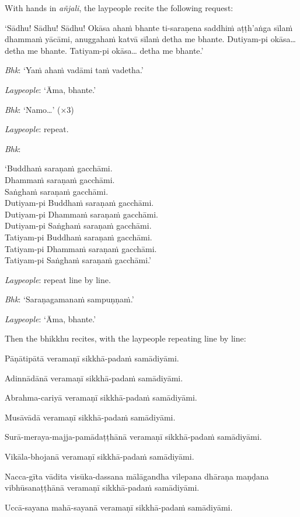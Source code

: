 With hands in \emph{añjali}, the laypeople recite the following request:

‘Sādhu! Sādhu! Sādhu! Okāsa ahaṁ bhante ti-saraṇena saddhiṁ aṭṭh'aṅga sīlaṁ
dhammaṁ yācāmi, anuggahaṁ katvā sīlaṁ detha me bhante. Dutiyam-pi okāsa… detha
me bhante. Tatiyam-pi okāsa… detha me bhante.’

\emph{Bhk}: ‘Yaṁ ahaṁ vadāmi taṁ vadetha.’

\emph{Laypeople}: ‘Āma, bhante.’

\emph{Bhk}: ‘Namo…’ (×3)

\emph{Laypeople}: repeat.

\emph{Bhk}:

‘Buddhaṁ saraṇaṁ gacchāmi.\\
Dhammaṁ saraṇaṁ gacchāmi.\\
Saṅghaṁ saraṇaṁ gacchāmi.\\
Dutiyam-pi Buddhaṁ saraṇaṁ gacchāmi.\\
Dutiyam-pi Dhammaṁ saraṇaṁ gacchāmi.\\
Dutiyam-pi Saṅghaṁ saraṇaṁ gacchāmi.\\
Tatiyam-pi Buddhaṁ saraṇaṁ gacchāmi.\\
Tatiyam-pi Dhammaṁ saraṇaṁ gacchāmi.\\
Tatiyam-pi Saṅghaṁ saraṇaṁ gacchāmi.’

\emph{Laypeople}: repeat line by line.

\emph{Bhk}: ‘Saraṇagamanaṁ sampuṇṇaṁ.’

\emph{Laypeople}: ‘Āma, bhante.’

Then the bhikkhu recites, with the laypeople repeating line by line:

\begin{packeditemize}

\item Pāṇātipātā veramaṇī sikkhā-padaṁ samādiyāmi.
\item Adinnādānā veramaṇī sikkhā-padaṁ samādiyāmi.
\item Abrahma-cariyā veramaṇī sikkhā-padaṁ samādiyāmi.
\item Musāvādā veramaṇī sikkhā-padaṁ samādiyāmi.
\item Surā-meraya-majja-pamādaṭṭhānā veramaṇī sikkhā-padaṁ samādiyāmi.
\item Vikāla-bhojanā veramaṇī sikkhā-padaṁ samādiyāmi.
\item Nacca-gīta vādita visūka-dassana mālāgandha vilepana dhāraṇa maṇḍana vibhūsanaṭṭhānā veramaṇī sikkhā-padaṁ samādiyāmi.
\item Uccā-sayana mahā-sayanā veramaṇī sikkhā-padaṁ samādiyāmi.

\end{packeditemize}

